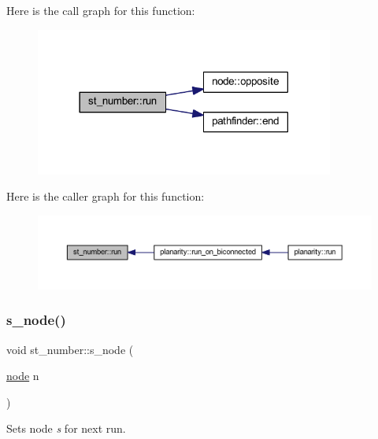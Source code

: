 Here is the call graph for this function\+:\nopagebreak
\begin{figure}[H]
\begin{center}
\leavevmode
\includegraphics[width=278pt]{classst__number_af902a0c05d07d47b587e8f7a6b7beaa1_cgraph}
\end{center}
\end{figure}
Here is the caller graph for this function\+:\nopagebreak
\begin{figure}[H]
\begin{center}
\leavevmode
\includegraphics[width=350pt]{classst__number_af902a0c05d07d47b587e8f7a6b7beaa1_icgraph}
\end{center}
\end{figure}
\mbox{\label{classst__number_aa607c9aaa5a4d9c45e5854ce672f0fda}} 
\subsubsection{\texorpdfstring{s\+\_\+node()}{s\_node()}\hspace{0.1cm}{\footnotesize\ttfamily [1/2]}}
{\footnotesize\ttfamily void st\+\_\+number\+::s\+\_\+node (\begin{DoxyParamCaption}\item[{\mbox{\hyperlink{classnode}{node}}}]{n }\end{DoxyParamCaption})\hspace{0.3cm}{\ttfamily [inline]}}



Sets node {\itshape s} for next run. 

